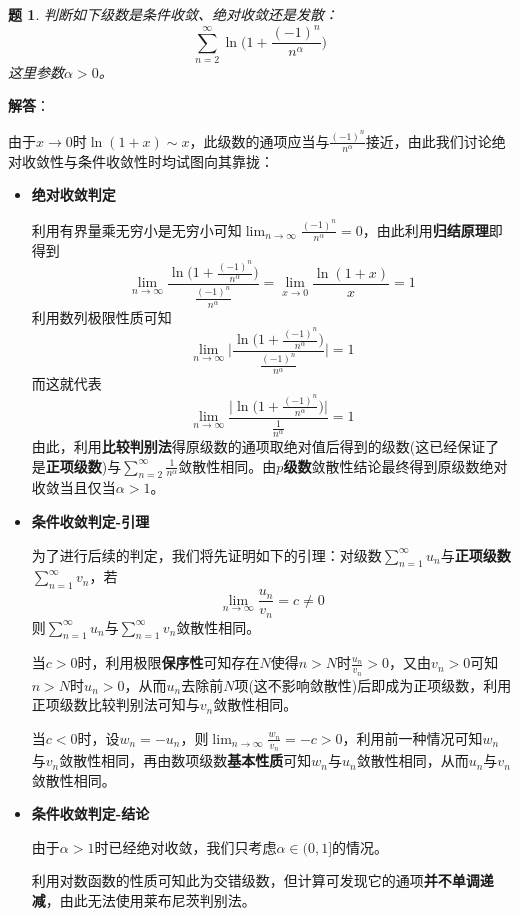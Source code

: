 \documentclass[a4paper,UTF8,fontset=windows,AutoFakeBold]{ctexart}
\newcommand*{\suminf}[1][n=1]{\sum_{#1}^\infty}
\newcommand*{\note}{\noindent *}
\theoremstyle{ex}
\newtheorem{exercise}{题}
\newcommand{\sol}[1]{{\vspace{5pt}\kaishu\noindent\textbf{解答}：\vspace{-3pt}
\begin{compactitem}
    \item[] #1
\end{compactitem}
}}
\begin{document}
\begin{framed}
\begin{exercise}\label{ln alter}
    判断如下级数是条件收敛、绝对收敛还是发散：
    $$\suminf[n=2]\ln\bigg(1+\frac{(-1)^n}{n^\alpha}\bigg)$$
    这里参数$\alpha>0$。
\end{exercise}
\sol{
    由于$x\to0$时$\ln(1+x)\sim x$，此级数的通项应当与$\frac{(-1)^n}{n^\alpha}$接近，由此我们讨论绝对收敛性与条件收敛性时均试图向其靠拢：
    \begin{itemize}
        \item \textbf{绝对收敛判定}
        
        利用有界量乘无穷小是无穷小可知$\lim_{n\to\infty}\frac{(-1)^n}{n^\alpha}=0$，由此利用\textbf{归结原理}即得到
        $$\lim_{n\to\infty}\frac{\ln\big(1+\frac{(-1)^n}{n^\alpha}\big)}{\frac{(-1)^n}{n^\alpha}}=\lim_{x\to0}\frac{\ln(1+x)}{x}=1$$
        利用数列极限性质可知
        $$\lim_{n\to\infty}\bigg|\frac{\ln\big(1+\frac{(-1)^n}{n^\alpha}\big)}{\frac{(-1)^n}{n^\alpha}}\bigg|=1$$
        而这就代表
        $$\lim_{n\to\infty}\frac{\big|\ln\big(1+\frac{(-1)^n}{n^\alpha}\big)\big|}{\frac{1}{n^\alpha}}=1$$
        由此，利用\textbf{比较判别法}得原级数的通项取绝对值后得到的级数(这已经保证了是\textbf{正项级数})与$\suminf[n=2]\frac{1}{n^\alpha}$敛散性相同。由\textbf{$p$级数}敛散性结论最终得到原级数绝对收敛当且仅当$\alpha>1$。

        \item \textbf{条件收敛判定-引理}
        
        为了进行后续的判定，我们将先证明如下的引理：对级数$\suminf u_n$与\textbf{正项级数}$\suminf v_n$，若
        $$\lim_{n\to\infty}\frac{u_n}{v_n}=c\ne0$$
        则$\suminf u_n$与$\suminf v_n$敛散性相同。

        当$c>0$时，利用极限\textbf{保序性}可知存在$N$使得$n>N$时$\frac{u_n}{v_n}>0$，又由$v_n>0$可知$n>N$时$u_n>0$，从而$u_n$去除前$N$项(这不影响敛散性)后即成为正项级数，利用正项级数比较判别法可知与$v_n$敛散性相同。

        当$c<0$时，设$w_n=-u_n$，则$\lim_{n\to\infty}\frac{w_n}{v_n}=-c>0$，利用前一种情况可知$w_n$与$v_n$敛散性相同，再由数项级数\textbf{基本性质}可知$w_n$与$u_n$敛散性相同，从而$u_n$与$v_n$敛散性相同。

        
        \item \textbf{条件收敛判定-结论}
        
        由于$\alpha>1$时已经绝对收敛，我们只考虑$\alpha\in(0,1]$的情况。

        \note 利用对数函数的性质可知此为交错级数，但计算可发现它的通项\textbf{并不单调递减}，由此无法使用莱布尼茨判别法。
        

\end{itemize}}
\end{framed}
\end{document}
